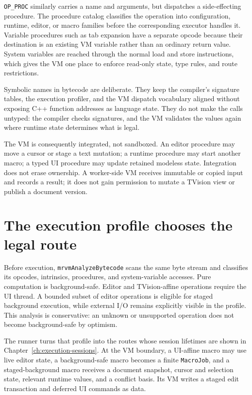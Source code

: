 \documentclass[a4paper,10pt,twoside,openany]{book}
\begin{document}
\texttt{OP\_PROC} similarly carries a name and arguments, but dispatches a
side-effecting procedure. The procedure catalog classifies the operation into
configuration, runtime, editor, or macro families before the corresponding
executor handles it. Variable procedures such as tab expansion have a
separate opcode because their destination is an existing VM variable rather
than an ordinary return value. System variables are reached through the normal
load and store instructions, which gives the VM one place to enforce
read-only state, type rules, and route restrictions.

Symbolic names in bytecode are deliberate. They keep the compiler's signature
tables, the execution profiler, and the VM dispatch vocabulary aligned without
exposing C++ function addresses as language state. They do not make the calls
untyped: the compiler checks signatures, and the VM validates the values again
where runtime state determines what is legal.

The VM is consequently integrated, not sandboxed. An editor procedure may
move a cursor or stage a text mutation; a runtime procedure may start another
macro; a typed UI procedure may update retained modeless state. Integration
does not erase ownership. A worker-side VM receives immutable or copied input
and records a result; it does not gain permission to mutate a TVision view or
publish a document version.

\section{The execution profile chooses the legal route}

Before execution, \texttt{mrvmAnalyzeBytecode} scans the same byte stream and
classifies its opcodes, intrinsics, procedures, and system-variable accesses.
Pure computation is background-safe. Editor and TVision-affine operations
require the UI thread. A bounded subset of editor operations is eligible for
staged background execution, while external I/O remains explicitly visible in
the profile. This analysis is conservative: an unknown or unsupported
operation does not become background-safe by optimism.

The runner turns that profile into the routes whose session lifetimes are
shown in Chapter~\ref{ch:execution-sessions}. At the VM boundary, a UI-affine
macro may use live editor state, a background-safe macro becomes a finite
\texttt{MacroJob}, and a staged-background macro receives a document snapshot,
cursor and selection state, relevant runtime values, and a conflict basis.
Its VM writes a staged edit transaction and deferred UI commands as data.
\end{document}
